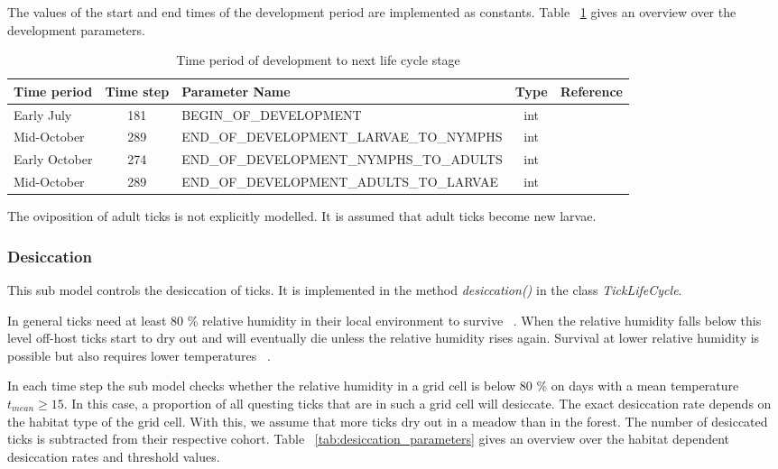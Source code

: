 \documentclass[a4paper, 11pt]{scrartcl}
\begin{document}
The values of the start and end times of the development period are implemented as constants. Table ~\ref{tab:development_parameters} gives an overview over the
development parameters.

\begin{table}[h!]
\caption{Time period of development to next life cycle stage}
\label{tab:development_parameters}
\begin{tabularx}{\textwidth}{lclcl}
\toprule
\textbf{Time period} 	& \textbf{Time step} & \textbf{Parameter Name}							& \textbf{Type}    & \textbf{Reference} \\
\midrule
Early July   			& 181   			 & \tiny{BEGIN\_OF\_DEVELOPMENT}					& int      & ~\cite{tba}   		\\
Mid-October     		& 289      			 & \tiny{END\_OF\_DEVELOPMENT\_LARVAE\_TO\_NYMPHS}	& int      & ~\cite{tba}      	\\
Early October    		& 274    			 & \tiny{END\_OF\_DEVELOPMENT\_NYMPHS\_TO\_ADULTS}	& int      & ~\cite{tba}     	\\
Mid-October     		& 289      			 & \tiny{END\_OF\_DEVELOPMENT\_ADULTS\_TO\_LARVAE}	& int      & ~\cite{tba}        \\
\bottomrule
\end{tabularx}
\end{table}

The oviposition of adult ticks is not explicitly modelled. It is assumed that adult ticks become new larvae.


\subsubsection{Desiccation}
This sub model controls the desiccation of ticks. It is implemented in the method \textit{desiccation()} in the class \textit{TickLifeCycle}.

In general ticks need at least 80 \% relative humidity in their local environment to survive ~\parencite{Medlock.2013, Gray.2016, Hauser.2018}. When the relative humidity falls
below this level off-host ticks start to dry out and will eventually die unless the relative humidity rises again. Survival at lower relative humidity is possible but also
requires lower temperatures ~\parencite{Ostfeld.2015}.

In each time step the sub model checks whether the relative humidity in a grid cell is below 80 \% on days with a mean temperature $t_{mean} \geq 15$. In this case, a proportion of
all questing ticks that are in such a grid cell will desiccate. The exact desiccation rate depends on the habitat type of the grid cell. With this, we assume that more
ticks dry out in a meadow than in the forest. The number of desiccated ticks is subtracted from their respective cohort. Table ~\ref{tab:desiccation_parameters} gives an
overview over the habitat dependent desiccation rates and threshold values.
\end{document}
